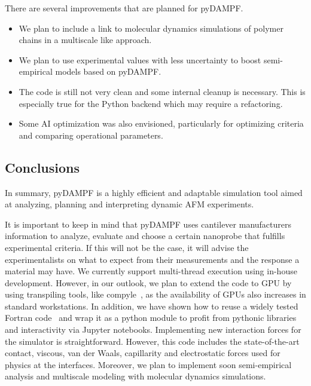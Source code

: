 \documentclass[letterpaper,compsoc,twoside]{IEEEtran}
\begin{document}
There are several improvements that are planned for pyDAMPF.
\begin{itemize}
\item 

We plan to include a link to molecular dynamics simulations of polymer chains in a multiscale like approach.

\item

We plan to use experimental values with less uncertainty to boost semi-empirical models based on pyDAMPF.


\item 

The code is still not very clean and some internal cleanup is necessary.
This is especially true for the Python backend which may require a refactoring.

\item
Some AI optimization was also envisioned, particularly for optimizing criteria and comparing operational parameters.

\end{itemize}



\subsection{Conclusions%
  \label{Conclusions}%
}



In summary, pyDAMPF is a highly efficient and adaptable simulation tool aimed at analyzing, planning and interpreting dynamic AFM experiments. 

It is important to keep in mind that pyDAMPF uses cantilever manufacturers information to analyze, evaluate and choose a certain nanoprobe that fulfills experimental criteria. If this will not be the case, it will advise the experimentalists on what to expect from their measurements and the response a material may have. We currently support multi-thread execution using in-house development. However, in our outlook, we plan to extend the code to GPU by using transpiling tools, like compyle~\cite{compyleScipy2019}, as the availability of GPUs also increases in standard workstations.
In addition, we have shown how to reuse a widely tested Fortran code~\cite{GuzmanACSnano2013} and wrap it as a python module to profit from pythonic libraries and interactivity via Jupyter notebooks. Implementing new interaction forces for the simulator is straightforward. However, this code includes the state-of-the-art contact, viscous, van der Waals, capillarity and electrostatic forces used for physics at the interfaces.
Moreover, we plan to implement soon semi-empirical analysis and multiscale modeling with molecular dynamics simulations.
\end{document}
